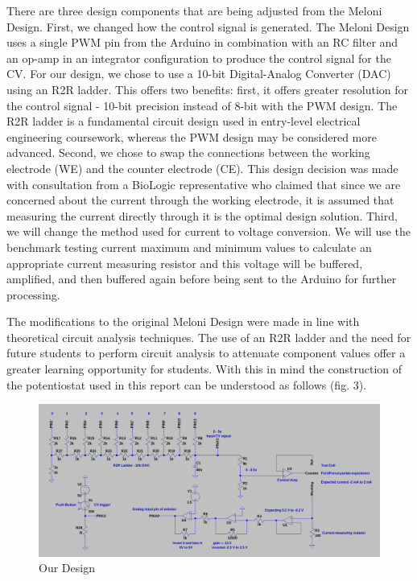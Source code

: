 \documentclass{article}
\begin{document}
There are three design components that are being adjusted from the Meloni Design. First, we changed how the control signal is generated. The Meloni Design uses a single PWM pin from the Arduino in combination with an RC filter and an op-amp in an integrator configuration to produce the control signal for the CV. For our design, we chose to use a 10-bit Digital-Analog Converter (DAC) using an R2R ladder. This offers two benefits: first, it offers greater resolution for the control signal - 10-bit precision instead of 8-bit with the PWM design. The R2R ladder is a fundamental circuit design used in entry-level electrical engineering coursework, whereas the PWM design may be considered more advanced. Second, we chose to swap the connections between the working electrode (WE) and the counter electrode (CE). This design decision was made with consultation from a BioLogic representative who claimed that since we are concerned about the current through the working electrode, it is assumed that measuring the current directly through it is the optimal design solution. Third, we will change the method used for current to voltage conversion. We will use the benchmark testing current maximum and minimum values to calculate an appropriate current measuring resistor and this voltage will be buffered, amplified, and then buffered again before being sent to the Arduino for further processing.

The modifications to the original Meloni Design were made in line with theoretical circuit analysis techniques. The use of an R2R ladder and the need for future students to perform circuit analysis to attenuate component values offer a greater learning opportunity for students. With this in mind the construction of the potentiostat used in this report can be understood as follows (fig. 3).

\begin{figure}[h]
    \centering
    \includegraphics[width=.9\linewidth]{diy_design.png}
    \caption{Our Design}
\end{figure}
\end{document}
